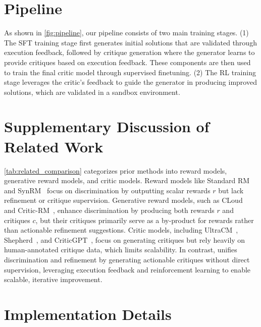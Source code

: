 \section{Pipeline}\label{appendix:pipeline}
As shown in \cref{fig:pipeline}, our pipeline consists of two main training stages. (1) The SFT training stage first generates initial solutions that are validated through execution feedback, followed by critique generation where the generator learns to provide critiques based on execution feedback. These components are then used to train the final critic model through supervised finetuning. (2) The RL training stage leverages the critic's feedback to guide the generator in producing improved solutions, which are validated in a sandbox environment.



\section{Supplementary Discussion of Related Work}\label{appendix:related}
\cref{tab:related_comparison} categorizes prior methods into reward models, generative reward models, and critic models. Reward models like Standard RM~\cite{bradley1952rank} and SynRM~\cite{ye2024improving} focus on discrimination by outputting scalar rewards $r$ but lack refinement or critique supervision. Generative reward models, such as CLoud~\cite{ankner2024critique} and Critic-RM~\cite{yu2024self}, enhance discrimination by producing both rewards $r$ and critiques $c$, but their critiques primarily serve as a by-product for rewards rather than actionable refinement suggestions. Critic models, including UltraCM~\cite{cui2023ultrafeedback}, Shepherd~\cite{wang2023shepherd}, and CriticGPT~\cite{mcaleese2024llm}, focus on generating critiques but rely heavily on human-annotated critique data, which limits scalability. In contrast, {\ours} unifies discrimination and refinement by generating actionable critiques without direct supervision, leveraging execution feedback and reinforcement learning to enable scalable, iterative improvement.














\section{Implementation Details}
